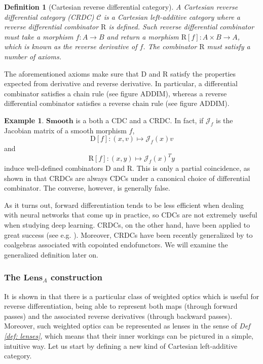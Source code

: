\documentclass[12pt,a4paper,openright,twoside]{report}
\theoremstyle{plain}
\newtheorem{definition}[proposition]{Definition}
\theoremstyle{definition}
\newtheorem{example}[proposition]{Example}
\begin{document}
\begin{definition}[Cartesian reverse differential category]
  A Cartesian reverse differential category (CRDC) $\mathcal{C}$ is a Cartesian left-additive category where a reverse differential combinator $\mathrm{R}$ is defined. Such reverse differential combinator must take a morphism $f: A \to B$ and return a morphism $\mathrm{R}[f]: A \times B \to A$, which is known as the reverse derivative of $f$. The combinator $\mathrm{R}$ must satisfy a number of axioms. 
\end{definition}


The aforementioned axioms make sure that $\mathrm{D}$ and $\mathrm{R}$ satisfy the properties expected from derivative and reverse derivative. In particular, a differential combinator satisfies a chain rule (see figure ADDIM), whereas a reverse differential combinator satisfies a reverse chain rule (see figure ADDIM).


\begin{example}
  $\mathbf{Smooth}$ is a both a CDC and a CRDC. In fact, if $\mathcal{J}_f$ is the Jacobian matrix of a smooth morphism $f$,
  \[\mathrm{D}[f]: (x,v) \mapsto \mathcal{J}_f(x)v\]
  and
  \[\mathrm{R}[f]: (x,y) \mapsto \mathcal{J}_f(x)^Ty\]
  induce well-defined combinators $\mathrm{D}$ and $\mathrm{R}$. This is only a partial coincidence, as shown in \cite{cockett2019reverse} that CRDCs are always CDCs under a canonical choice of differential combinator. The converse, however, is generally false.
\end{example}


As it turns out, forward differentiation tends to be less efficient when dealing with neural networks that come up in practice, so CDCs are not extremely useful when studying deep learning. CRDCs, on the other hand, have been applied to great success (see e.g. \cite{cruttwell2022categorical}). Moreover, CRDCs have been recently generalized by \cite{gavranovic2024fundamental} to coalgebras associated with copointed endofunctors. We will examine the generalized definition later on.



\subsubsection{The $\mathbf{Lens}_A$ construction}


It is shown in \cite{gavranovic2024fundamental} that there is a particular class of weighted optics which is useful for reverse differentiation, being able to represent both maps (through forward passes) and the associated reverse derivatives (through backward passes). Moreover, such weighted optics can be represented as lenses in the sense of \textit{Def \ref{def: lenses}}, which means that their inner workings can be pictured in a simple, intuitive way.
Let us start by defining a new kind of Cartesian left-additive category.
\end{document}
